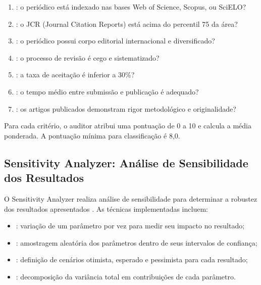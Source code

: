 \begin{enumerate}
\item {}: o periódico está indexado nas bases Web of Science,
      Scopus, ou SciELO?
\item {}: o JCR (Journal Citation Reports) está acima
      do percentil 75 da área?
\item {}: o periódico possui corpo editorial
      internacional e diversificado?
\item {}: o processo de revisão é cego e
      sistematizado?
\item {}: a taxa de aceitação é inferior a 30\%?
\item {}: o tempo médio entre submissão e
      publicação é adequado?
\item {}: os artigos publicados demonstram rigor
      metodológico e originalidade?
\end{enumerate}

Para cada critério, o auditor atribui uma pontuação de 0 a 10 e calcula a
média ponderada. A pontuação mínima para classificação \qualisA{} é 8,0.

\subsection{Sensitivity Analyzer: Análise de Sensibilidade dos Resultados}

O Sensitivity Analyzer realiza análise de sensibilidade para determinar a
robustez dos resultados apresentados \cite{box1976science}. As técnicas
implementadas incluem:

\begin{itemize}
\item {}: variação de um parâmetro por vez
      para medir seu impacto no resultado;
\item {}: amostragem aleatória dos parâmetros
      dentro de seus intervalos de confiança;
\item {}: definição de cenários otimista, esperado
      e pessimista para cada resultado;
\item {}: decomposição da variância
      total em contribuições de cada parâmetro.
\end{itemize}

